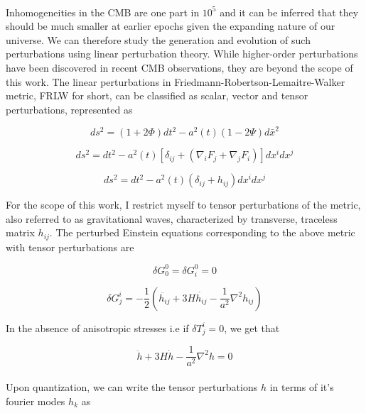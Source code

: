 \documentclass[12pt,a4paper,oneside]{book}
\begin{document}
\paragraph*{} Inhomogeneities in the CMB are one part in $10^5$ and it can be inferred that they should be much smaller at earlier epochs given the expanding nature of our universe. We can therefore study the generation and evolution of such perturbations using linear perturbation theory. While higher-order perturbations have been discovered in recent CMB observations, they are beyond the scope of this work. The linear perturbations in Friedmann-Robertson-Lemaitre-Walker metric, FRLW for short, can be classified as scalar, vector and tensor perturbations, represented as

\begin{equation}
ds^2 = (1+2\Phi)dt^2 - a^2(t)(1-2\Psi)d\bar{x}^2
\end{equation}

\begin{equation}
ds^2 = dt^2 - a^2(t)[\delta_{ij} + (\nabla_iF_j +\nabla_jF_i)]dx^idx^j
\end{equation}

\begin{equation}
ds^2 = dt^2 - a^2(t)(\delta_{ij} + h_{ij})dx^idx^j
\end{equation}

For the scope of this work, I restrict myself to tensor perturbations of the metric, also referred to as gravitational waves, characterized by transverse, traceless matrix $h_{ij}$. The perturbed Einstein equations corresponding to the above metric with tensor perturbations are

\begin{equation}
\delta G^0_0 = \delta G^0_i = 0
\end{equation}

\begin{equation}
\delta G^i_j = -\frac{1}{2}(\ddot{h_{ij}} + 3H\dot{h_{ij}} - \frac{1}{a^2}\nabla ^2h_{ij})
\end{equation}

\noindent In the absence of anisotropic stresses i.e if $\delta T^i_j = 0$, we get that

\begin{equation}
\ddot{h} + 3H\dot{h} - \frac{1}{a^2}\nabla ^2h = 0
\end{equation}

\paragraph*{} Upon quantization, we can write the tensor perturbations $h$ in terms of it's fourier modes $h_k$ as
\end{document}
